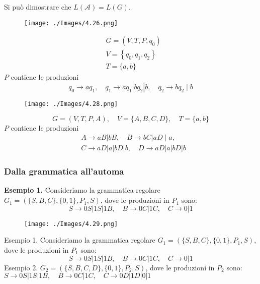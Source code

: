 Si può dimostrare che $L(\mathcal{A})=L(G)$.

\begin{figure}[hbpt!]
    \centering
    \texttt{[image: ./Images/4.26.png]}
\end{figure}
\FloatBarrier

$$
\begin{aligned}
&G=\left(V, T, P, q_{0}\right) \\
&V=\left\{q_{0}, q_{1}, q_{2}\right\} \\
&T=\{a, b\}
\end{aligned}
$$
$P$ contiene le produzioni
$$
q_{0} \rightarrow a q_{1}, \quad q_{1} \rightarrow a q_{1}\left|b q_{2}\right| b, \quad q_{2} \rightarrow b q_{2} \mid b
$$

\begin{figure}[hbpt!]
    \centering
    \texttt{[image: ./Images/4.28.png]}
\end{figure}

$$
G=(V, T, P, A), \quad V=\{A, B, C, D\}, \quad T=\{a, b\}
$$
$P$ contiene le produzioni
$$
\begin{aligned}
&A \rightarrow a B|b B, \quad B \rightarrow b C| a D \mid a, \\
&C \rightarrow a D|a| b D|b, \quad D \rightarrow a D| a|b D| b
\end{aligned}
$$

\subsubsection{Dalla grammatica all'automa}

\textbf{Esempio 1.} Consideriamo la grammatica regolare $G_{1}=\left(\{S, B, C\},\{0,1\}, P_{1}, S\right)$, dove le produzioni in $P_{1}$ sono:
$$
S \rightarrow 0 S|1 S| 1 B, \quad B \rightarrow 0 C|1 C, \quad C \rightarrow 0| 1
$$

\begin{figure}[hbpt!]
    \centering
    \texttt{[image: ./Images/4.29.png]}
\end{figure}
\FloatBarrier

Esempio 1. Consideriamo la grammatica regolare
$G_{1}=\left(\{S, B, C\},\{0,1\}, P_{1}, S\right)$, dove le produzioni in $P_{1}$ sono:
$$
S \rightarrow 0 S|1 S| 1 B, \quad B \rightarrow 0 C|1 C, \quad C \rightarrow 0| 1
$$
Esempio 2. $G_{2}=\left(\{S, B, C, D\},\{0,1\}, P_{2}, S\right)$, dove le
produzioni in $P_{2}$ sono:
$S \rightarrow 0 S|1 S| 1 B, \quad B \rightarrow 0 C|1 C, \quad C \rightarrow 0 D| 1 D|0| 1$

